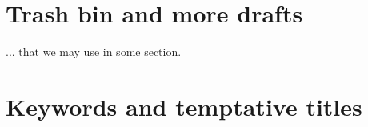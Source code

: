 \documentclass[12pt]{book}
\begin{document}
%
%

\setcounter{chapter}{-1}
\chapter{Trash bin and more drafts}
... that we may use in some section.
\vfill\minitoc\newpage

\newpage
\newpage
\newpage

%
%

\setcounter{chapter}{-1}


\setcounter{chapter}{-1}
\chapter{Keywords and temptative titles}


\printbibliography[heading=bibintoc]
\end{document}
